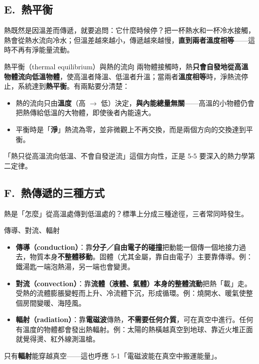 \documentclass[11pt]{article}
\begin{document}
\subsection*{\sffamily E.\ 熱平衡}

熱既然是因溫差而傳遞，就要追問：它什麼時候停？把一杯熱水和一杯冷水接觸，熱會從熱水流向冷水；但溫差越來越小，傳遞越來越慢，\textbf{直到兩者溫度相等}——這時不再有淨能量流動。

\begin{補充框}{熱平衡（thermal equilibrium）與熱的流向}
兩物體接觸時，熱\textbf{只會自發地從高溫物體流向低溫物體}，使高溫者降溫、低溫者升溫；當兩者\textbf{溫度相等}時，淨熱流停止，系統達到\textbf{熱平衡}。有兩點要分清楚：
\begin{itemize}\setlength{\itemsep}{1pt}
\item 熱的流向只由\textbf{溫度}（高 $\rightarrow$ 低）決定，\textbf{與內能總量無關}——高溫的小物體仍會把熱傳給低溫的大物體，即使後者內能遠大。
\item 平衡時是「\textbf{淨}」熱流為零，並非微觀上不再交換，而是兩個方向的交換達到平衡。
\end{itemize}
「熱只從高溫流向低溫、不會自發逆流」這個方向性，正是 5-5 要深入的熱力學第二定律。
\end{補充框}


\subsection*{\sffamily F.\ 熱傳遞的三種方式}

熱是「怎麼」從高溫處傳到低溫處的？標準上分成三種途徑，三者常同時發生。

\begin{補充框}{傳導、對流、輻射}
\begin{itemize}\setlength{\itemsep}{2pt}
\item \textbf{傳導（conduction）}：靠\textbf{分子／自由電子的碰撞}把動能一個傳一個地接力過去，物質本身\textbf{不整體移動}。固體（尤其金屬，靠自由電子）主要靠傳導。例：鐵湯匙一端泡熱湯，另一端也會變燙。
\item \textbf{對流（convection）}：靠\textbf{流體（液體、氣體）本身的整體流動}把熱「載」走。受熱的流體膨脹變輕而上升、冷流體下沉，形成循環。例：燒開水、暖氣使整個房間變暖、海陸風。
\item \textbf{輻射（radiation）}：靠\textbf{電磁波}傳熱，\textbf{不需要任何介質}，可在真空中進行。任何有溫度的物體都會發出熱輻射。例：太陽的熱橫越真空到地球、靠近火堆正面就覺得燙、紅外線測溫槍。
\end{itemize}
只有\textbf{輻射}能穿越真空——這也呼應 5-1「電磁波能在真空中搬運能量」。
\end{補充框}
\end{document}
